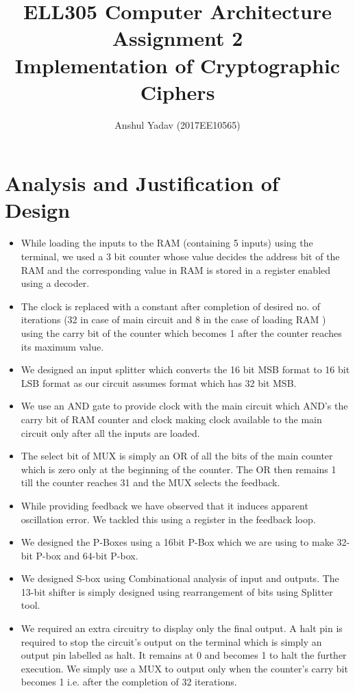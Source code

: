 \documentclass[fullpage]{article}
\title{ELL305 Computer Architecture \\
	Assignment 2\\
	Implementation of Cryptographic Ciphers
}
\author{Anshul Yadav (2017EE10565)}
\begin{document}
\maketitle



\section{Analysis and Justification of Design}
\begin{itemize}
	\item While loading the inputs to the RAM (containing 5 inputs) using the terminal, we used a 3 bit counter whose value decides the address bit of the RAM and the corresponding value in RAM is stored in a register enabled using a decoder. 
	\item The clock is replaced with a constant after completion of desired no. of iterations (32 in case of main circuit and 8 in the case of loading RAM ) using the carry bit of the counter which becomes 1 after the counter reaches its maximum value. 
	\item We designed an input splitter which converts the 16 bit MSB format to 16 bit LSB format as our circuit assumes format which has 32 bit MSB.
	\item We use an AND gate to provide clock with the main circuit which AND’s the carry bit of RAM counter and clock making clock available to the main circuit only after all the inputs are loaded. 
	\item The select bit of MUX is simply an OR of all the bits of the main counter which is zero only at the beginning of the counter. The OR then remains  1 till the counter reaches 31 and the MUX selects the feedback.
	\item While providing feedback we have observed that it induces apparent oscillation error. We tackled this using a register in the feedback loop. 
	\item We designed the P-Boxes using a 16bit P-Box which we are using to make 32-bit P-box and 64-bit P-box.
	\item We designed S-box using Combinational analysis of input and outputs. The 13-bit shifter is simply designed using rearrangement of bits using Splitter tool.
	\item We required an extra circuitry to display only the final output. A halt pin is required to stop the circuit’s output on the terminal which is simply an output pin labelled as halt. It remains at 0 and becomes 1 to halt the further execution. We simply use a MUX to output only when the counter’s carry bit becomes 1 i.e. after the completion of 32 iterations. 
	
\end{itemize}
\end{document}

